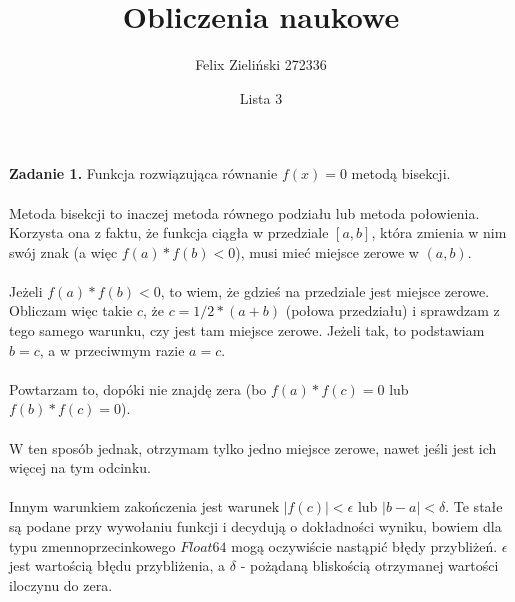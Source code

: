 \documentclass[15pt, a4paper]{article}
\title{Obliczenia naukowe}
\author{Felix Zieliński 272336}
\date{Lista 3}
\begin{document}
\maketitle

\vspace{0.5cm}

\noindent\hrulefill

\vspace{0.5cm}


\noindent\textbf{Zadanie 1.} Funkcja rozwiązująca równanie \( f(x) = 0 \) metodą bisekcji.\\\\
\noindent Metoda bisekcji to inaczej metoda równego podziału lub metoda połowienia. 
Korzysta ona z faktu, że funkcja ciągła w przedziale \( [a, b] \), która zmienia w nim swój znak (a więc \( f(a) * f(b) < 0 \)), musi mieć miejsce zerowe w \( (a, b) \).\\\\
\noindent Jeżeli \( f(a) * f(b) < 0 \), to wiem, że gdzieś na przedziale jest miejsce zerowe. Obliczam więc takie \(c\), że \( c = 1/2 * (a + b) \) (połowa przedziału) i sprawdzam z tego samego warunku, czy jest tam miejsce zerowe. Jeżeli tak, to podstawiam \( b = c \), a w przeciwmym razie \( a = c \).\\\\
\noindent Powtarzam to, dopóki nie znajdę zera (bo \( f(a) * f(c) = 0 \) lub \(f(b) * f(c) = 0 \)). \\\\
\noindent W ten sposób jednak, otrzymam tylko jedno miejsce zerowe, nawet jeśli jest ich więcej na tym odcinku.\\\\ 
\noindent Innym warunkiem zakończenia jest warunek \(|f(c)| < \epsilon \) lub \(|b - a| < \delta \). Te stałe są podane przy wywołaniu funkcji i decydują o dokładności wyniku, bowiem dla typu zmennoprzecinkowego \(Float64\) mogą oczywiście nastąpić błędy przybliżeń. \( \epsilon \) jest wartością błędu przybliżenia, a \(\delta\) - pożądaną bliskością otrzymanej wartości iloczynu do zera. 

\pagebreak
\end{document}
